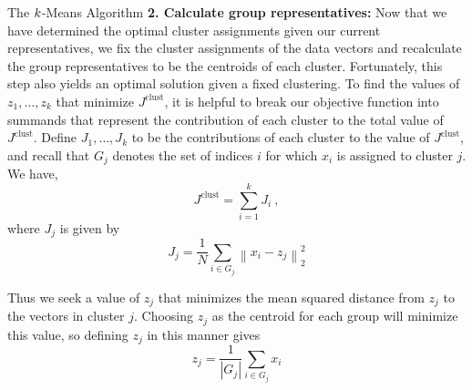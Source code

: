 \documentclass{article}
\newcommand{\norm}[2]{\left \lVert #1 \right \rVert_{#2}}
\begin{document}
\begin{section}{The $\boldmath{k}$-Means Algorithm}
\textbf{2. Calculate group representatives:} Now that we have determined the optimal cluster assignments given our current representatives, we fix the cluster assignments of the data vectors and recalculate the group representatives to be the centroids of each cluster.  Fortunately, this step also yields an optimal solution given a fixed clustering. To find the values of $z_1,\ldots,z_k$ that minimize $J^{\text{clust}}$, it is helpful to break our objective function into summands that represent the contribution of each cluster to the total value of $J^{\text{clust}}$. Define $J_1,\ldots,J_k$ to be the contributions of each cluster to the value of $J^{\text{clust}}$, and recall that $G_j$ denotes the set of indices $i$ for which $x_i$ is assigned to cluster $j$. We have,
\[J^{\text{clust}} = \sum_{i=1}^{k}{J_i}\:,\]
where $J_j$ is given by
\[J_j = \frac{1}{N}\sum_{i \in G_j}{\norm{x_i - z_j}{2}^{2}}\]

Thus we seek a value of $z_j$ that minimizes the mean squared distance from $z_j$ to the vectors in cluster $j$. Choosing $z_j$ as the centroid for each group will minimize this value, so defining $z_j$ in this manner gives
\[z_j = \frac{1}{|G_j|}\sum_{i\in{G_j}}{x_i} \tag{2}\]  


\end{section}
\end{document}
